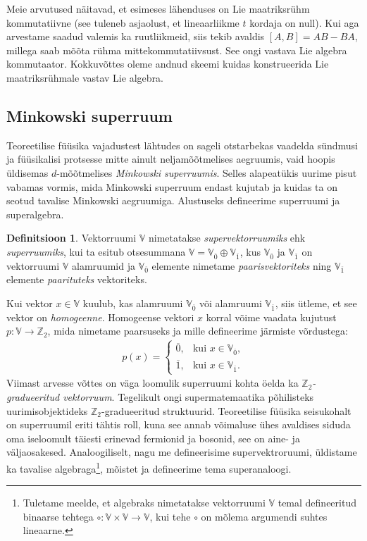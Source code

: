 \documentclass[12pt]{article}
\theoremstyle{plain}
\theoremstyle{definition}
\newtheorem{definitsioon}{Definitsioon}[section]
\numberwithin{equation}{section}
\def\V{{\mathbb V}}
\def\Z{{\mathbb Z}}
\begin{document}
Meie arvutused näitavad, et esimeses lähenduses on Lie maatriksrühm 
kommutatiivne (see tuleneb asjaolust, et lineaarliikme $t$ kordaja 
on null). Kui aga arvestame saadud valemis ka ruutliikmeid, siis 
tekib avaldis $\left[A,B\right] = AB - BA$, millega saab mõõta rühma 
mittekommutatiivsust. See ongi vastava Lie algebra kommutaator. 
Kokkuvõttes oleme andnud skeemi kuidas konstrueerida Lie 
maatriksrühmale vastav Lie algebra.

\subsection{Minkowski superruum}

Teoreetilise füüsika vajadustest lähtudes on sageli otstarbekas 
vaadelda sünd\-musi ja füüsikalisi protsesse mitte ainult 
neljamõõtmelises aegruumis, vaid hoopis üldisemas $d$-mõõtmelises
\emph{Minkowski superruumis}. Selles alapeatükis uurime pisut 
vabamas vormis, mida Minkowski superruum endast kujutab ja kuidas 
ta on seotud tavalise Minkowski aegruumiga. Alustuseks defineerime 
superruumi ja superalgebra.

\begin{definitsioon}
Vektorruumi $\V$ nimetatakse \emph{supervektorruumiks} ehk 
\emph{superruumiks}, kui ta esitub otsesummana 
$\V = \V_{\overline{0}} \oplus \V_{\overline{1}}$, kus 
$\V_{\overline{0}}$ ja $\V_{\overline{1}}$ on vektorruumi $\V$ 
alamruumid ja $\V_{\overline{0}}$ elemente nimetame 
\emph{paarisvektoriteks} ning $\V_{\overline{1}}$ elemente 
\emph{paarituteks} vektoriteks.
\end{definitsioon}

Kui vektor $x \in \V$ kuulub, kas alamruumi $\V_{\overline{0}}$ või 
alamruumi $\V_{\overline{1}}$, siis ütleme, et see vektor on 
\emph{homogeenne}. Homogeense vektori $x$ korral võime vaadata 
kujutust $p : \V \rightarrow \Z_2$, mida nimetame paarsuseks ja mille 
defineerime järmiste võrdustega:
\begin{align*}
p\left(x\right) = \begin{cases}
    \overline{0},& \text{kui $x \in \V_{\overline{0}}$},\\
    \overline{1},& \text{kui $x \in \V_{\overline{1}}$}.
  \end{cases}
\end{align*}
Viimast arvesse võttes on väga loomulik superruumi kohta öelda ka 
\emph{$\Z_2$-graduee\-ritud vektorruum}. Tegelikult ongi 
supermatemaatika põhilisteks uurimisobjektideks $\Z_2$-gradueeritud 
struktuurid. Teoreetilise füüsika seisukohalt on superruumil 
eriti tähtis roll, kuna see annab võimaluse ühes avaldises 
siduda oma iseloomult täiesti erinevad fermionid ja bosonid, 
see on aine- ja väljaosakesed. Analoogiliselt, nagu me defineerisime 
supervektroruumi, üldistame ka tavalise algebraga\footnote{
Tuletame meelde, et algebraks nimetatakse 
vektorruumi $\V$ temal defineeritud binaarse tehtega 
$\circ : \V \times \V \rightarrow \V$, kui tehe $\circ$ on mõlema 
argumendi suhtes lineaarne.}, 
mõistet ja defineerime tema superanaloogi.
\end{document}

